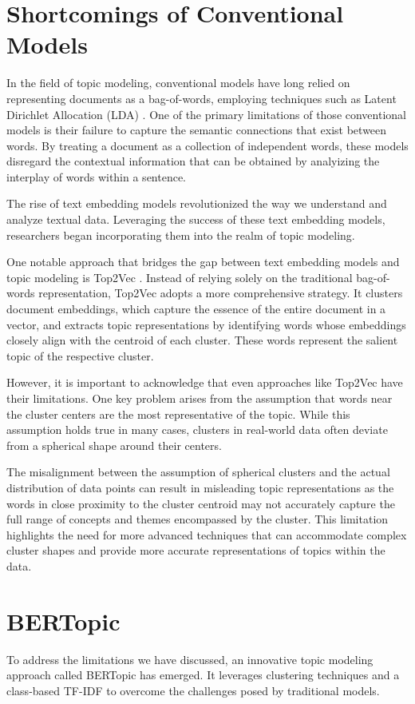 \documentclass[a4paper,10pt]{report}
\begin{document}
\section{Shortcomings of Conventional Models}
In the field of topic modeling, conventional models have long relied on representing documents as a bag-of-words, employing techniques such as Latent Dirichlet Allocation (LDA) \cite{BleiLDA}. One of the primary limitations of those conventional models is their failure to capture the semantic connections that exist between words. By treating a document as a collection of independent words, these models disregard the contextual information that can be obtained by analyizing the interplay of words within a sentence.

The rise of text embedding models revolutionized the way we understand and analyze textual data. Leveraging the success of these text embedding models, researchers began incorporating them into the realm of topic modeling.

One notable approach that bridges the gap between text embedding models and topic modeling is Top2Vec \cite{TopToVec}. Instead of relying solely on the traditional bag-of-words representation, Top2Vec adopts a more comprehensive strategy. It clusters document embeddings, which capture the essence of the entire document in a vector, and extracts topic representations by identifying words whose embeddings closely align with the centroid of each cluster. These words represent the salient topic of the respective cluster.

However, it is important to acknowledge that even approaches like Top2Vec have their limitations. One key problem arises from the assumption that words near the cluster centers are the most representative of the topic. While this assumption holds true in many cases, clusters in real-world data often deviate from a spherical shape around their centers.

The misalignment between the assumption of spherical clusters and the actual distribution of data points can result in misleading topic representations as the words in close proximity to the cluster centroid may not accurately capture the full range of concepts and themes encompassed by the cluster. This limitation highlights the need for more advanced techniques that can accommodate complex cluster shapes and provide more accurate representations of topics within the data. \cite{bertopic}

\section{BERTopic}
To address the limitations we have discussed, an innovative topic modeling approach called BERTopic \cite{bertopic} has emerged. It leverages clustering techniques and a class-based TF-IDF to overcome the challenges posed by traditional models.
\end{document}
